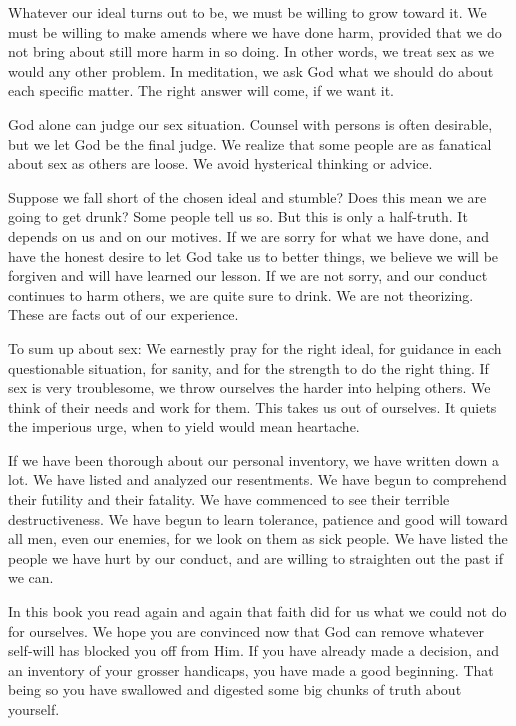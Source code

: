 \begin{biblechapter}
Whatever our ideal turns out to be, we must be willing to grow toward it.  We must be willing to make amends where we have done harm,  provided that we do not bring about still more harm in so doing.  In other words, we treat sex as we would any other problem.  In meditation, we ask God what we should do about each specific matter.  The right answer will come, if we want it.

God alone can judge our sex situation.  Counsel with persons is often desirable, but we let God be the final judge.  We realize that some people are as fanatical about sex as others are loose.  We avoid hysterical thinking or advice.

\verse Suppose we fall short of the chosen ideal and stumble?
\verse Does this mean we are going to get drunk?
\verse Some people tell us so.
\verse But this is only a half-truth.
\verse It depends on us and on our motives.
\verse If we are sorry for what we have done, 
    and have the honest desire to let God take us to better things, 
    we believe we will be forgiven and will have learned our lesson.
\verse If we are not sorry, 
    and our conduct continues to harm others, 
    we are quite sure to drink.
\verse We are not theorizing.
\verse These are facts out of our experience.

\verse To sum up about sex:  
    We earnestly pray for the right ideal, 
    for guidance in each questionable situation, 
    for sanity, 
    and for the strength to do the right thing.
\verse If sex is very troublesome, 
    we throw ourselves the harder into helping others.
\verse We think of their needs and work for them.
\verse This takes us out of ourselves.
\verse It quiets the imperious urge, when to yield would mean heartache.

\verse If we have been thorough about our personal inventory, 
    we have written down a lot.
\verse We have listed and analyzed our resentments.
\verse We have begun to comprehend their futility and their fatality.
\verse We have commenced to see their terrible destructiveness.
\verse We have begun to learn 
    tolerance, patience and good will 
    toward all men, even our enemies, 
    for we look on them as sick people.
\verse We have listed the people we have hurt by our conduct, 
    and are willing to straighten out the past if we can.

\verse In this book you read again and again that 
    faith did for us what we could not do for ourselves.
\verse We hope you are convinced now that 
    God can remove whatever self-will has blocked you off from Him.
\verse If you have already made a decision, 
    and an inventory of your grosser handicaps, 
    you have made a good beginning.
\verse That being so you have swallowed and digested 
    some big chunks of truth about yourself.
\end{biblechapter}
